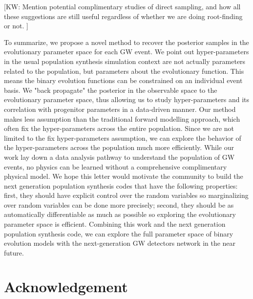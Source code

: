 \documentclass[twocolumn]{aastex631}
\newcommand{\kw}[1]{{\color{rb4}[KW: #1 ]}}
\begin{document}
\kw{Mention potential complimentary studies of direct sampling, and how all these suggestions are still useful regardless of whether we are doing root-finding or not.}

To summarize, we propose a novel method to recover the posterior samples in the evolutionary parameter space for each GW event.
We point out hyper-parameters in the usual population synthesis simulation context are not actually parameters related to the population,
but parameters about the evolutionary function.
This means the binary evolution functions can be constrained on an individual event basis.
We "back propagate" the posterior in the observable space to the evolutionary parameter space,
thus allowing us to study hyper-parameters and its correlation with progenitor parameters in a data-driven manner.
Our method makes less assumption than the traditional forward modelling approach,
which often fix the hyper-parameters across the entire population.
Since we are not limited to the fix hyper-parameters assumption, we can explore the behavior of the hyper-parameters across the population much more efficiently.
While our work lay down a data analysis pathway to understand the population of GW events,
no physics can be learned without a comprehensive complimentary physical model.
We hope this letter would motivate the community to build the next generation population synthesis codes that have the following properties:
first, they should have explicit control over the random variables so marginalizing over random variables can be done more precisely;
second, they should be as automatically differentiable as much as possible so exploring the evolutionary parameter space is efficient.
Combining this work and the next generation population synthesis code,
we can explore the full parameter space of binary evolution models with the next-generation GW detectors network in the near future.





\section{Acknowledgement}
\end{document}

